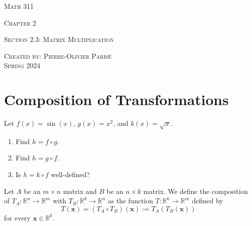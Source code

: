 \documentclass[20pt,a4paper]{extarticle}
\newcommand{\ra}{\rightarrow}
\newcounter{example}[section]
\newcounter{definition}[section]
\begin{document}
\thispagestyle{empty}

\begin{center}
\vspace*{2.5cm}

{\Huge \textsc{Math 311}}

\vspace*{1.5cm}

{\LARGE \textsc{Chapter 2}} 

\vspace*{0.75cm}

\noindent\textsc{Section 2.3: Matrix Multiplication}

\vspace*{0.75cm}

\tableofcontents

\vfill

\noindent \textsc{Created by: Pierre-Olivier Paris{\'e}} \\
\textsc{Spring 2024}
\end{center}

\newpage

\section{Composition of Transformations}

\begin{example}
Let $f (x) = \sin (x)$, $g(x) = x^2$, and $k (x) = \sqrt{x}$. 
	\begin{enumerate}[label=\alph*)]
		\item Find $h = f \circ g$.
		\item Find $h = g \circ f$.
		\item Is $h = k \circ f$ well-defined?
	\end{enumerate}
\end{example}

\begin{solution}

\end{solution}

\vfill 

\begin{definition}
Let $A$ be an $m \times n$ matrix and $B$ be an $n \times k$ matrix. We define the composition of $T_A : \mathbb{R}^n \ra \mathbb{R}^m$ with $T_B : \mathbb{R}^k \ra \mathbb{R}^n$ as the function $T : \mathbb{R}^k \ra \mathbb{R}^m$ defined by
	\[
		T (\mathbf{x}) = (T_A \circ T_B) (\mathbf{x}) := T_A (T_B (\mathbf{x}))
	\]
for every $\mathbf{x} \in \mathbb{R}^k$.
\end{definition}
\end{document}
